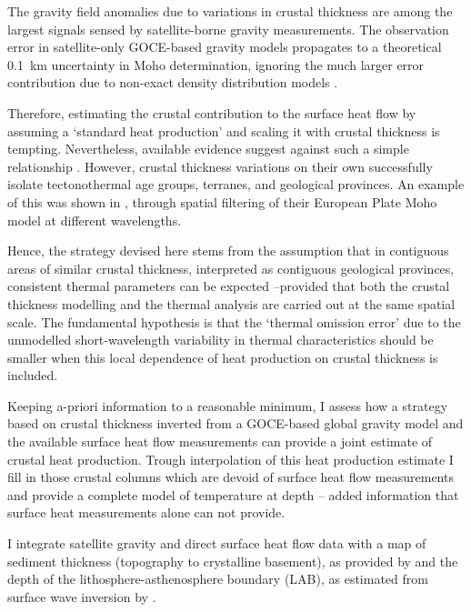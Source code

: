 The gravity field anomalies due to variations in crustal thickness are among the largest signals sensed by satellite-borne gravity measurements.
The observation error in satellite-only GOCE-based gravity models propagates to a theoretical 0.1~\si{\kilo \metre} uncertainty in Moho determination, ignoring the much larger error contribution due to non-exact density distribution models \parencite{braitenberg2011goce}.

Therefore, estimating the crustal contribution to the surface heat flow by assuming a `standard heat production' and scaling it with crustal thickness is tempting.
Nevertheless, available evidence suggest against such a simple relationship \parencite{Mareschal2013}.
However, crustal thickness variations on their own successfully isolate tectonothermal age groups, terranes, and geological provinces.
An example of this was shown in \textcite{Grad2009}, through spatial filtering of their European Plate Moho model at different wavelengths.

Hence, the strategy devised here stems from the assumption that in contiguous areas of similar crustal thickness, interpreted as contiguous geological provinces, consistent thermal parameters can be expected --provided that both the crustal thickness modelling and the thermal analysis are carried out at the same spatial scale.
The fundamental hypothesis is that the `thermal omission error' due to the unmodelled short-wavelength variability in thermal characteristics should be smaller when this local dependence of heat production on crustal thickness is included.

Keeping a-priori information to a reasonable minimum, I assess how a strategy based on crustal thickness inverted from a GOCE-based global gravity model and the available surface heat flow measurements can provide a joint estimate of crustal heat production.
Trough interpolation of this heat production estimate I fill in those crustal columns which are devoid of surface heat flow measurements and provide a complete model of temperature at depth -- added information that surface heat measurements alone can not provide. 

I integrate satellite gravity and direct surface heat flow data with a map of sediment thickness (topography to crystalline basement), as provided by \textcite{Tesauro2008} and the depth of the lithosphere-asthenosphere boundary (LAB), as estimated from surface wave inversion by \textcite{Pasyanos2014}.

